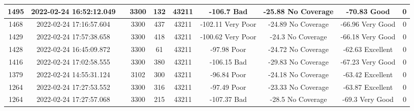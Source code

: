 \begin{longtable*}{|c|c|c|c|c|c|c|c|c|c|}
1495&2022-02-24 16:52:12.049&&3300&132&43211& -106.7    Bad         & -25.88    No Coverage & -70.83    Good        & 0\\\hline
{}1468&2022-02-24 17:16:57.604&&3300&437&43211& -102.11   Very Poor   & -24.89    No Coverage & -66.96    Very Good   & 0\\\hline
{}1429&2022-02-24 17:57:38.658&&3300&418&43211& -100.62   Very Poor   & -24.3     No Coverage & -66.18    Very Good   & 0\\\hline
{}1428&2022-02-24 16:45:09.872&&3300&61&43211& -97.98    Poor        & -24.72    No Coverage & -62.63    Excellent   & 0\\\hline
{}1416&2022-02-24 17:02:58.555&&3300&380&43211& -106.15   Bad         & -29.83    No Coverage & -67.23    Very Good   & 0\\\hline
{}1379&2022-02-24 14:55:31.124&&3102&300&43211& -96.84    Poor        & -24.18    No Coverage & -63.42    Excellent   & 0\\\hline
{}1264&2022-02-24 17:27:53.552&&3300&316&43211& -97.49    Poor        & -23.33    No Coverage & -63.87    Excellent   & 0\\\hline
{}1264&2022-02-24 17:27:57.068&&3300&215&43211& -107.37   Bad         & -28.5     No Coverage & -69.3     Very Good   & 0\\\hline

\end{longtable*}

